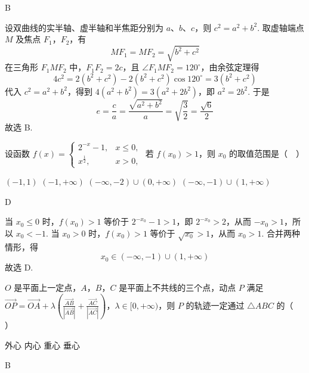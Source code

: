 \begin{answer}
B
\end{answer}

\begin{solution}
设双曲线的实半轴、虚半轴和半焦距分别为 \(a\)、\(b\)、\(c\)，则 \(c^2=a^2+b^2\). 取虚轴端点 \(M\) 及焦点 \(F_1\)，\(F_2\)，有
\[
MF_1=MF_2=\sqrt{b^2+c^2}
\]
在三角形 \(F_1MF_2\) 中，\(F_1F_2=2c\)，且 \(\angle F_1MF_2=120^\circ\)，由余弦定理得
\[
4c^2=2(b^2+c^2)-2(b^2+c^2)\cos120^\circ=3(b^2+c^2)
\]
代入 \(c^2=a^2+b^2\)，得到 \(4(a^2+b^2)=3(a^2+2b^2)\)，即 \(a^2=2b^2\). 于是
\[
e=\frac ca=\frac{\sqrt{a^2+b^2}}{a}=\sqrt{\frac32}=\frac{\sqrt6}{2}
\]
故选 B.
\end{solution}

\begin{problem}
设函数 \(f(x) = \begin{cases}
2^{-x} - 1, & x \leqslant 0,\\
x^{\frac{1}{2}}, & x > 0,
\end{cases}\) 若 \(f(x_0) > 1\)，则 \(x_0\) 的取值范围是（\(\quad\)）

\choices
    {\((-1,1)\)}
    {\((-1,+\infty)\)}
    {\((-\infty,-2)\cup(0,+\infty)\)}
    {\((-\infty,-1)\cup(1,+\infty)\)}
\end{problem}

\begin{answer}
D
\end{answer}

\begin{solution}
当 \(x_0\leqslant0\) 时，\(f(x_0)>1\) 等价于 \(2^{-x_0}-1>1\)，即 \(2^{-x_0}>2\)，从而 \(-x_0>1\)，所以 \(x_0<-1\). 当 \(x_0>0\) 时，\(f(x_0)>1\) 等价于 \(\sqrt{x_0}>1\)，从而 \(x_0>1\). 合并两种情形，得
\[
x_0\in(-\infty,-1)\cup(1,+\infty)
\]
故选 D.
\end{solution}

\begin{problem}
\(O\) 是平面上一定点，\(A\)，\(B\)，\(C\) 是平面上不共线的三个点，动点 \(P\) 满足 \(\overrightarrow{OP} = \overrightarrow{OA} + \lambda \left(\frac{\overrightarrow{AB}}{|\overrightarrow{AB}|} + \frac{\overrightarrow{AC}}{|\overrightarrow{AC}|}\right)\)，\(\lambda \in [0,+\infty)\)，则 \(P\) 的轨迹一定通过 \(\triangle ABC\) 的（\(\quad\)）

\choices
    {外心}
    {内心}
    {重心}
    {垂心}
\end{problem}

\begin{answer}
B
\end{answer}

